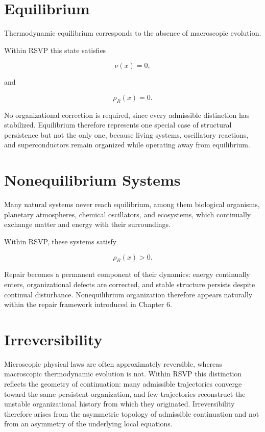 \documentclass[11pt,oneside]{book}
\numberwithin{equation}{chapter}
\theoremstyle{definition}
\theoremstyle{plain}
\begin{document}
\section{Equilibrium}

Thermodynamic equilibrium corresponds to the absence of macroscopic
evolution.

Within RSVP this state satisfies

\[
\nu(x)=0,
\]

and

\[
\rho_R(x)=0.
\]

No organizational correction is required, since every admissible distinction has stabilized. Equilibrium therefore represents one special case of structural persistence but not the only one, because living systems, oscillatory reactions, and superconductors remain organized while operating away from equilibrium.

\section{Nonequilibrium Systems}

Many natural systems never reach equilibrium, among them biological organisms, planetary atmospheres, chemical oscillators, and ecosystems, which continually exchange matter and energy with their surroundings.

Within RSVP, these systems satisfy

\[
\rho_R(x)>0.
\]

Repair becomes a permanent component of their dynamics: energy continually enters, organizational defects are corrected, and stable structure persists despite continual disturbance. Nonequilibrium organization therefore appears naturally within the repair framework introduced in Chapter 6.

\section{Irreversibility}

Microscopic physical laws are often approximately reversible, whereas macroscopic thermodynamic evolution is not. Within RSVP this distinction reflects the geometry of continuation: many admissible trajectories converge toward the same persistent organization, and few trajectories reconstruct the unstable organizational history from which they originated. Irreversibility therefore arises from the asymmetric topology of admissible continuation and not from an asymmetry of the underlying local equations.
\end{document}
